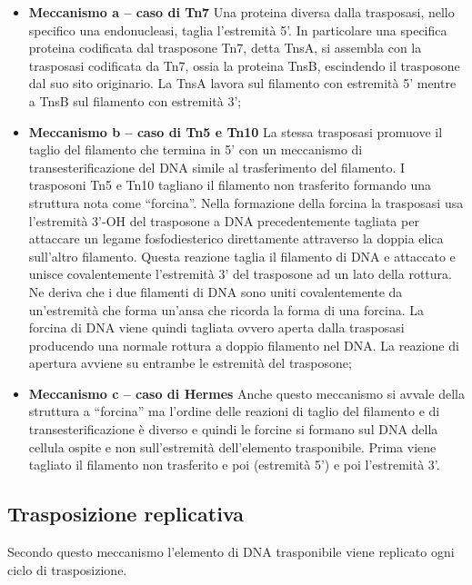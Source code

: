 \documentclass[11pt]{book}
\begin{document}
\begin{itemize}
\item
  \textbf{Meccanismo a -- caso di Tn7} Una proteina diversa dalla
  trasposasi, nello specifico una endonucleasi, taglia l'estremità 5'.
  In particolare una specifica proteina codificata dal trasposone Tn7,
  detta TnsA, si assembla con la trasposasi codificata da Tn7, ossia la
  proteina TnsB, escindendo il trasposone dal suo sito originario. La
  TnsA lavora sul filamento con estremità 5' mentre a TnsB sul filamento
  con estremità 3';
\item
  \textbf{Meccanismo b -- caso di Tn5 e Tn10} La stessa trasposasi
  promuove il taglio del filamento che termina in 5' con un meccanismo
  di transesterificazione del DNA simile al trasferimento del filamento.
  I trasposoni Tn5 e Tn10 tagliano il filamento non trasferito formando
  una struttura nota come ``forcina''. Nella formazione della forcina la
  trasposasi usa l'estremità 3'-OH del trasposone a DNA precedentemente
  tagliata per attaccare un legame fosfodiesterico direttamente
  attraverso la doppia elica sull'altro filamento. Questa reazione
  taglia il filamento di DNA e attaccato e unisce covalentemente
  l'estremità 3' del trasposone ad un lato della rottura. Ne deriva che
  i due filamenti di DNA sono uniti covalentemente da un'estremità che
  forma un'ansa che ricorda la forma di una forcina. La forcina di DNA
  viene quindi tagliata ovvero aperta dalla trasposasi producendo una
  normale rottura a doppio filamento nel DNA. La reazione di apertura
  avviene su entrambe le estremità del trasposone;
\item
  \textbf{Meccanismo c -- caso di Hermes} Anche questo meccanismo si
  avvale della struttura a ``forcina'' ma l'ordine delle reazioni di
  taglio del filamento e di transesterificazione è diverso e quindi le
  forcine si formano sul DNA della cellula ospite e non sull'estremità
  dell'elemento trasponibile. Prima viene tagliato il filamento non
  trasferito e poi (estremità 5') e poi l'estremità 3'.
\end{itemize}

\subsection{Trasposizione replicativa}
Secondo questo meccanismo l'elemento di DNA
trasponibile viene replicato ogni ciclo di trasposizione.
\end{document}
